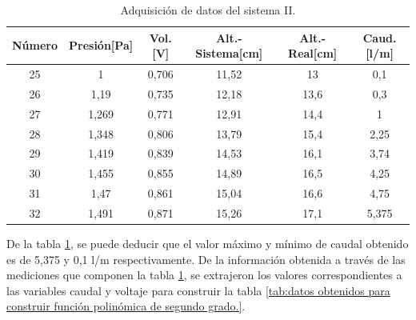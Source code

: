 \begin{table}[htpb]
	\centering
	\caption[Adquisición de datos del sistema II]{Adquisición de datos del sistema II.}
	\begin{tabular}{c c c c c c}    
		\toprule
		\textbf{Número}   & \textbf{Presión[Pa]}  & \textbf{Vol.[V]} & \textbf{Alt.-Sistema[cm]} & \textbf{Alt.-Real[cm]} & \textbf{Caud.[l/m]} \\
		\midrule
		25  & 1     & 0,706  & 11,52  & 13   &  0,1\\
		26  & 1,19  & 0,735  & 12,18  & 13,6 &  0,3\\
		27  & 1,269 & 0,771  & 12,91  & 14,4 &  1 \\
		28  & 1,348 & 0,806  & 13,79  & 15,4 &  2,25 \\
		29  & 1,419 & 0,839	 & 14,53  & 16,1 &  3,74\\
		30  & 1,455 & 0,855  & 14,89  & 16,5 &  4,25\\
		31  & 1,47  & 0,861	 & 15,04  & 16,6 &  4,75\\
		32  & 1,491 & 0,871	 & 15,26  & 17,1 &  5,375\\
		
		\bottomrule
		\hline
	\end{tabular}
	\label{tab:adquisición de datos del sistema II.}
\end{table}

\vspace{1cm}

De la tabla \ref{tab:adquisición de datos del sistema II.}, se puede deducir que el valor máximo y mínimo de caudal obtenido es de 5,375 y 0,1 l/m respectivamente.
De la información obtenida a través de las mediciones que componen la tabla \ref{tab:adquisición de datos del sistema II.}, se extrajeron los valores correspondientes a las variables caudal y voltaje para construir la tabla \ref{tab:datos obtenidos para construir función polinómica de segundo grado.}.

